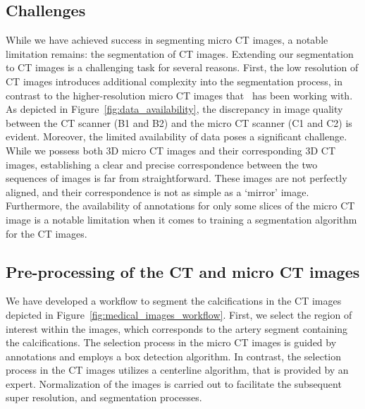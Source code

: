 \subsection{Challenges}
\label{sec:challenges}
While we have achieved
success in segmenting micro CT images, a notable limitation remains: the
segmentation of CT images. Extending our segmentation to CT
images is a challenging task for several reasons. First, the low resolution of CT
images introduces additional complexity into the segmentation process, in 
contrast to the higher-resolution micro CT images that~\cite{gangloff2020probabilistic} 
has been working with. As
depicted in Figure~\ref{fig:data_availability}, 
the discrepancy in image quality between the CT scanner (B1 and B2) and the micro CT 
scanner (C1 and C2) is evident. 
Moreover, the limited availability of data poses a significant
challenge. While we possess both 3D micro CT images and their corresponding 3D
CT images, establishing a clear and precise correspondence between the two 
sequences of images is far from straightforward. 
These images are not perfectly aligned, and
their correspondence is not as simple as a `mirror' image. Furthermore, the
availability of annotations for only some slices of the micro CT image is a
notable limitation when it comes to training a segmentation algorithm
for the CT images. 


\subsection{Pre-processing of the CT and micro CT images}
We have developed a workflow to segment the calcifications in the CT images
depicted in Figure~\ref{fig:medical_images_workflow}.
First, we select the region of interest within
the images, which corresponds to the artery segment containing the
calcifications. The selection process in the micro CT images is guided by
annotations and employs a box detection algorithm. In contrast, the
selection process in the CT images utilizes a centerline algorithm, that is 
provided by an expert. Normalization of the images is carried out
to facilitate the subsequent super resolution, and segmentation processes.\\

